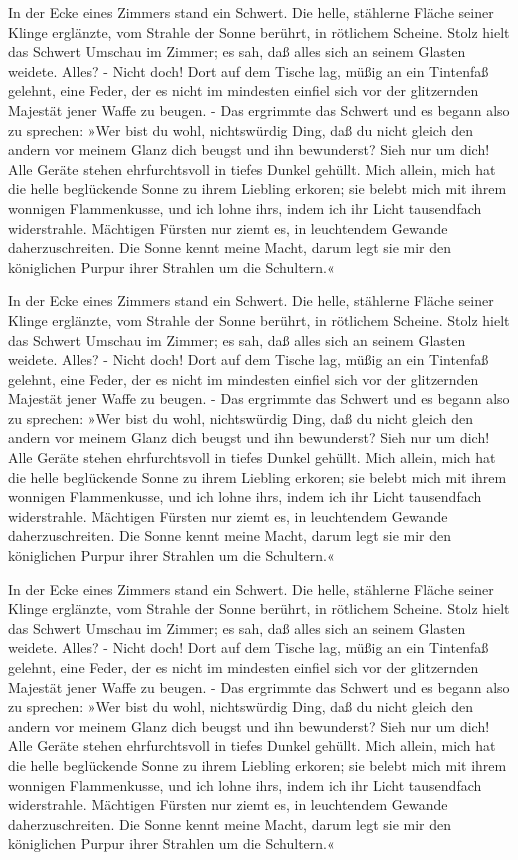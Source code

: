 In der Ecke eines Zimmers stand ein Schwert. Die helle, stählerne Fläche seiner
Klinge erglänzte, vom Strahle der Sonne berührt, in rötlichem Scheine. Stolz
hielt das Schwert Umschau im Zimmer; es sah, daß alles sich an seinem Glasten
weidete. Alles? - Nicht doch! Dort auf dem Tische \cite{btt:1998} lag, müßig an ein Tintenfaß
gelehnt, eine Feder, der es nicht im mindesten einfiel sich vor der
glitzernden Majestät jener Waffe zu beugen. - Das ergrimmte das Schwert und es
begann also zu sprechen: »Wer bist du wohl, nichtswürdig Ding, daß du nicht
gleich den andern vor meinem Glanz dich beugst und ihn bewunderst? Sieh nur
um dich! Alle Geräte stehen ehrfurchtsvoll in tiefes Dunkel gehüllt. Mich
allein, mich hat die helle beglückende Sonne zu ihrem Liebling erkoren; sie
belebt mich mit ihrem wonnigen Flammenkusse, und ich lohne ihrs, indem ich ihr
Licht tausendfach widerstrahle. Mächtigen Fürsten nur ziemt es, in leuchtendem
Gewande daherzuschreiten. Die Sonne kennt meine Macht, darum legt sie mir den
königlichen Purpur ihrer Strahlen um die Schultern.«

In der Ecke eines Zimmers stand ein Schwert. Die helle, stählerne Fläche seiner
Klinge erglänzte, vom Strahle der Sonne berührt, in rötlichem Scheine. Stolz
hielt das Schwert Umschau im Zimmer; es sah, daß alles sich an seinem Glasten
weidete. Alles? - Nicht doch! Dort auf dem Tische lag, müßig an ein Tintenfaß
gelehnt, eine Feder, der es nicht im mindesten einfiel sich vor der
glitzernden Majestät jener Waffe zu beugen. - Das ergrimmte das Schwert und es
begann also zu sprechen: »Wer bist du wohl, nichtswürdig Ding, daß du nicht
gleich den andern vor meinem Glanz dich beugst und ihn bewunderst? Sieh nur
um dich! Alle Geräte stehen ehrfurchtsvoll in tiefes Dunkel gehüllt. Mich
allein, mich hat die helle beglückende Sonne zu ihrem Liebling erkoren; sie
belebt mich mit ihrem wonnigen Flammenkusse, und ich lohne ihrs, indem ich ihr
Licht tausendfach widerstrahle. Mächtigen Fürsten nur ziemt es, in leuchtendem
Gewande daherzuschreiten. Die Sonne kennt meine Macht, darum legt sie mir den
königlichen Purpur ihrer Strahlen um die Schultern.«

In der Ecke eines Zimmers stand ein Schwert. Die helle, stählerne Fläche seiner
Klinge erglänzte, vom Strahle der Sonne berührt, in rötlichem Scheine. Stolz
hielt das Schwert Umschau im Zimmer; es sah, daß alles sich an seinem Glasten
weidete. Alles? - Nicht doch! Dort auf dem Tische lag, müßig an ein Tintenfaß
gelehnt, eine Feder, der es nicht im mindesten einfiel sich vor der
glitzernden Majestät jener Waffe zu beugen. - Das ergrimmte das Schwert und es
begann also zu sprechen: »Wer bist du wohl, nichtswürdig Ding, daß du nicht
gleich den andern vor meinem Glanz dich beugst und ihn bewunderst? Sieh nur
um dich! Alle Geräte stehen ehrfurchtsvoll in tiefes Dunkel gehüllt. Mich
allein, mich hat die helle beglückende Sonne zu ihrem Liebling erkoren; sie
belebt mich mit ihrem wonnigen Flammenkusse, und ich lohne ihrs, indem ich ihr
Licht tausendfach widerstrahle. Mächtigen Fürsten nur ziemt es, in leuchtendem
Gewande daherzuschreiten. Die Sonne kennt meine Macht, darum legt sie mir den
königlichen Purpur ihrer Strahlen um die Schultern.«


